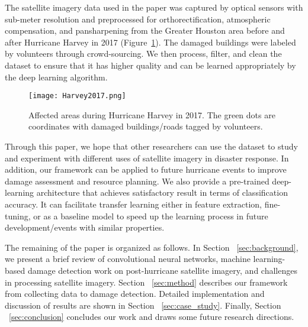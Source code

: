 \documentclass[journal, 12pt, onecolumn,draftclsnofoot]{IEEEtran}
\begin{document}
The satellite imagery data used in the paper was captured by optical sensors with sub-meter resolution and preprocessed for orthorectification, atmospheric compensation, and pansharpening from the Greater Houston area before and after Hurricane Harvey in 2017 (Figure~\ref{fig:Harvey}). The damaged buildings were labeled by volunteers through crowd-sourcing. We then process, filter, and clean the dataset to ensure that it has higher quality and can be learned appropriately by the deep learning algorithm. 


\begin{figure}[h]{\centering
\texttt{[image: Harvey2017.png]} \\
\centering\caption{\small{Affected areas during Hurricane Harvey in 2017. The green dots are coordinates with damaged buildings/roads tagged by volunteers.}}
\label{fig:Harvey}
}
\end{figure}

Through this paper, we hope that other researchers can use the dataset to study and experiment with different uses of satellite imagery in disaster response. In addition, our framework can be applied to future hurricane events to improve damage assessment and resource planning. We also provide a pre-trained deep-learning architecture that achieves satisfactory result in terms of classification accuracy. It can facilitate transfer learning either in feature extraction, fine-tuning, or as a baseline model to speed up the learning process in future development/events with similar properties. 

The remaining of the paper is organized as follows. In Section ~\ref{sec:background}, we present a brief review of convolutional neural networks, machine learning-based damage detection work on post-hurricane satellite imagery, and challenges in processing satellite imagery. Section ~\ref{sec:method} describes our framework from collecting data to damage detection. Detailed implementation and discussion of results are shown in Section ~\ref{sec:case_study}. Finally, Section ~\ref{sec:conclusion} concludes our work and draws some future research directions. 
\end{document}
